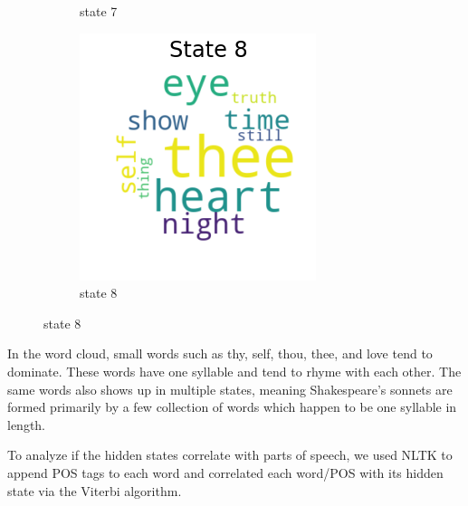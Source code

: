\begin{figure}[H]
\begin{subfigure}[t]{0.3\textwidth}
		\caption{state 7}
	\end{subfigure}%
	\begin{subfigure}[t]{0.3\textwidth}
		\includegraphics[width=\textwidth]{download(8).png}
		\caption{state 8}
	\end{subfigure}%
	\bigskip 
\end{figure}


In the word cloud, small words such as thy, self, thou, thee, and love tend to dominate. These words have one syllable and tend to rhyme with each other. The same words also shows up in multiple states, meaning Shakespeare's sonnets are formed primarily by a few collection of words which happen to be one syllable in length.

To analyze if the hidden states correlate with parts of speech, we used NLTK to append POS tags to each word and correlated each word/POS with its hidden state via the Viterbi algorithm.

